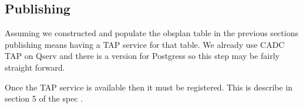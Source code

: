 \subsection{Publishing} \label{sec:tap}
Assuming we constructed and populate the obsplan table in the previous sections publishing means having a TAP service for that table.
We already use CADC TAP on Qserv and there is a version for Postgress so this step may be fairly straight forward.

Once the TAP service is available then it must be registered.
This is describe in section 5 of the spec \citep{2021ivoa.spec.0724S}.
